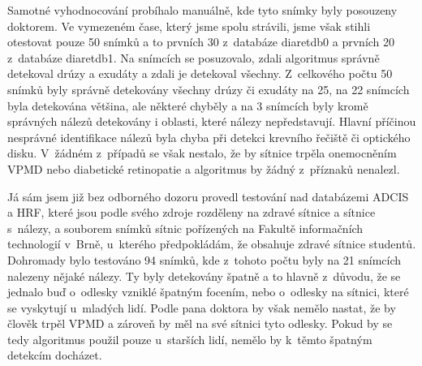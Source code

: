 Samotné vyhodnocování probíhalo manuálně, kde tyto snímky byly posouzeny doktorem. Ve vymezeném čase, který jsme spolu strávili, jsme však stihli otestovat pouze 50 snímků a to prvních 30 z~databáze diaretdb0 a prvních 20 z~databáze diaretdb1. Na snímcích se posuzovalo, zdali algoritmus správně detekoval drúzy a exudáty a zdali je detekoval všechny. Z~celkového počtu 50 snímků byly správně detekovány všechny drúzy či exudáty na 25, na 22 snímcích byla detekována většina, ale některé chyběly a na 3 snímcích byly kromě správných nálezů detekovány i oblasti, které nálezy nepředstavují. Hlavní příčinou nesprávné identifikace nálezů byla chyba při detekci krevního řečiště či optického disku. V~žádném z~případů se však nestalo, že by sítnice trpěla onemocněním VPMD nebo diabetické retinopatie a algoritmus by žádný z~příznaků nenalezl.

Já sám jsem již bez odborného dozoru provedl testování nad databázemi ADCIS a HRF, které jsou podle svého zdroje rozděleny na zdravé sítnice a sítnice s~nálezy, a souborem snímků sítnic pořízených na Fakultě informačních technologií v~Brně, u~kterého předpokládám, že obsahuje zdravé sítnice studentů. Dohromady bylo testováno 94 snímků, kde z~tohoto počtu byly na 21 snímcích nalezeny nějaké nálezy. Ty byly detekovány špatně a to hlavně z~důvodu, že se jednalo buď o~odlesky vzniklé špatným focením, nebo o~odlesky na sítnici, které se vyskytují u~mladých lidí. Podle pana doktora by však nemělo nastat, že by člověk trpěl VPMD a zároveň by měl na své sítnici tyto odlesky. Pokud by se tedy algoritmus použil pouze u~starších lidí, nemělo by k~těmto špatným detekcím docházet.
